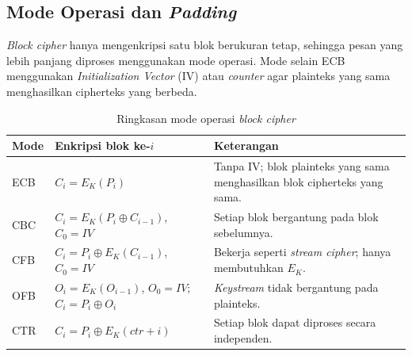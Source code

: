 \subsection{Mode Operasi dan \textit{Padding}}
\textit{Block cipher} hanya mengenkripsi satu blok berukuran tetap, sehingga pesan yang lebih panjang diproses menggunakan mode operasi. Mode selain ECB menggunakan \textit{Initialization Vector} (IV) atau \textit{counter} agar plainteks yang sama menghasilkan cipherteks yang berbeda. 

\begin{table}[H]
    \centering
    \small
    \caption{Ringkasan mode operasi \textit{block cipher}}
    \label{tab:mode_operasi}
    \begin{tabularx}{\textwidth}{@{}l >{\raggedright\arraybackslash}X >{\raggedright\arraybackslash}X@{}}
        \toprule
        \textbf{Mode} & \textbf{Enkripsi blok ke-$i$} & \textbf{Keterangan} \\
        \midrule
        ECB & $C_i = E_K(P_i)$ & Tanpa IV; blok plainteks yang sama menghasilkan blok cipherteks yang sama. \\
        CBC & $C_i = E_K(P_i \oplus C_{i-1})$, $C_0 = IV$ & Setiap blok bergantung pada blok sebelumnya. \\
        CFB & $C_i = P_i \oplus E_K(C_{i-1})$, $C_0 = IV$ & Bekerja seperti \textit{stream cipher}; hanya membutuhkan $E_K$. \\
        OFB & $O_i = E_K(O_{i-1})$, $O_0 = IV$; $C_i = P_i \oplus O_i$ & \textit{Keystream} tidak bergantung pada plainteks. \\
        CTR & $C_i = P_i \oplus E_K(\textit{ctr} + i)$ & Setiap blok dapat diproses secara independen. \\
        \bottomrule
    \end{tabularx}
\end{table}